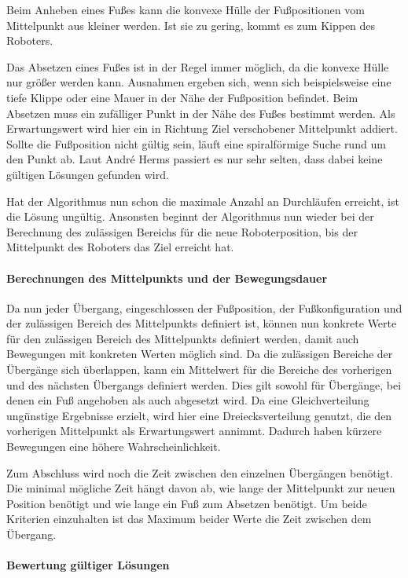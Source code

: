 Beim Anheben eines Fußes kann die konvexe Hülle der Fußpositionen vom Mittelpunkt aus kleiner werden. Ist sie zu gering, kommt es zum Kippen des Roboters.

Das Absetzen eines Fußes ist in der Regel immer möglich, da die konvexe Hülle nur größer werden kann. Ausnahmen ergeben sich, wenn sich beispielsweise eine tiefe Klippe oder eine Mauer in der Nähe der Fußposition befindet. Beim Absetzen muss ein zufälliger Punkt in der Nähe des Fußes bestimmt werden. Als Erwartungswert wird hier ein in Richtung Ziel verschobener Mittelpunkt addiert. Sollte die Fußposition nicht gültig sein, läuft eine spiralförmige Suche rund um den Punkt ab. Laut André Herms passiert es nur sehr selten, dass dabei keine gültigen Lösungen gefunden wird.

Hat der Algorithmus nun schon die maximale Anzahl an Durchläufen erreicht, ist die Lösung ungültig. Ansonsten beginnt der Algorithmus nun wieder bei der Berechnung des zulässigen Bereichs für die neue Roboterposition, bis der Mittelpunkt des Roboters das Ziel erreicht hat.

\paragraph{Berechnungen des Mittelpunkts und der Bewegungsdauer}

Da nun jeder Übergang, eingeschlossen der Fußposition, der Fußkonfiguration und der zulässigen Bereich des Mittelpunkts definiert ist, können nun konkrete Werte für den zulässigen Bereich des Mittelpunkts definiert werden, damit auch Bewegungen mit konkreten Werten möglich sind. Da die zulässigen Bereiche der Übergänge sich überlappen, kann ein Mittelwert für die Bereiche des vorherigen und des nächsten Übergangs definiert werden. Dies gilt sowohl für Übergänge, bei denen ein Fuß angehoben als auch abgesetzt wird. Da eine Gleichverteilung ungünstige Ergebnisse erzielt, wird hier eine Dreiecksverteilung genutzt, die den vorherigen Mittelpunkt als Erwartungswert annimmt. Dadurch haben kürzere Bewegungen eine höhere Wahrscheinlichkeit.  

Zum Abschluss wird noch die Zeit zwischen den einzelnen Übergängen benötigt. Die minimal mögliche Zeit hängt davon ab, wie lange der Mittelpunkt zur neuen Position benötigt und wie lange ein Fuß zum Absetzen benötigt. Um beide Kriterien einzuhalten ist das Maximum beider Werte die Zeit zwischen dem Übergang.

\paragraph{Bewertung gültiger Lösungen}

